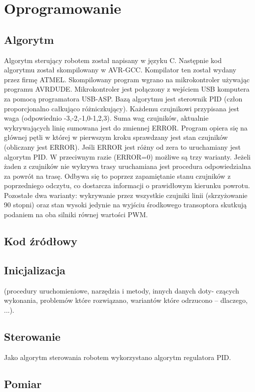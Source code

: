 \documentclass[11pt,a4paper]{article}
\begin{document}
\section{Oprogramowanie}
  \subsection{Algorytm}
  Algorytm sterujący robotem został napisany w języku C. Następnie kod algorytmu został skompilowany w AVR-GCC. Kompilator ten został wydany przez firmę ATMEL. Skompilowany program wgrano na mikrokontroler używając programu AVRDUDE. Mikrokontroler jest połączony z wejściem USB komputera za pomocą programatora USB-ASP. 
  Bazą algorytmu jest sterownik PID (człon proporcjonalno całkująco różniczkujący). Każdemu czujnikowi przypisana jest waga (odpowiednio -3,-2,-1,0-1,2,3). Suma wag czujników, aktualnie wykrywających linię sumowana jest do zmiennej ERROR.
   Program opiera się na głównej pętli w której w pierwszym kroku sprawdzany jest stan czujników (obliczany jest ERROR).
   Jeśli ERROR jest różny od zera to uruchamiany jest algorytm PID. W przeciwnym razie (ERROR=0) możliwe są trzy warianty.
   Jeżeli żaden z czujników nie wykrywa trasy uruchamiana jest procedura odpowiedzialna za powrót na trasę. Odbywa się to poprzez zapamiętanie stanu czujników z poprzedniego odczytu, co dostarcza informacji o prawidłowym kierunku powrotu.
   Pozostałe dwa warianty: wykrywanie przez wszystkie czujniki linii (skrzyżowanie 90 stopni) oraz stan wysoki jedynie na wyjściu środkowego transoptora skutkują podaniem na oba silniki równej wartości PWM.

  \subsection{Kod źródłowy}
  
  
  \subsection{Inicjalizacja} (procedury uruchomieniowe, narzędzia i metody, innych danych doty-
czących wykonania, problemów które rozwiązano, wariantów które odrzucono – dlaczego,
...).
  \subsection{Sterowanie}
  Jako algorytm sterowania robotem wykorzystano algorytm regulatora PID.
  \subsection{Pomiar}  
  
\end{document}
